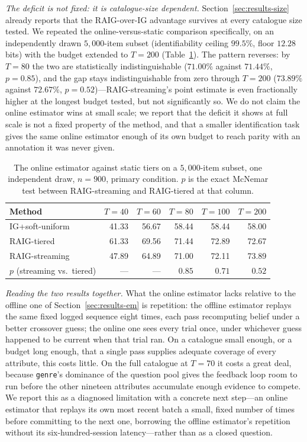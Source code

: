 \emph{The deficit is not fixed: it is catalogue-size dependent.}
Section~\ref{sec:results-size} already reports that the RAIG-over-IG
advantage survives at every catalogue size tested. We repeated the
online-versus-static comparison specifically, on an independently drawn
$5{,}000$-item subset (identifiability ceiling $99.5\%$, floor $12.28$ bits)
with the budget extended to $T=200$ (Table~\ref{tab:streamsize}). The pattern
reverses: by $T=80$ the two are statistically indistinguishable ($71.00\%$
against $71.44\%$, $p = 0.85$), and the gap stays indistinguishable from zero
through $T=200$ ($73.89\%$ against $72.67\%$, $p = 0.52$)---RAIG-streaming's
point estimate is even fractionally higher at the longest budget tested, but
not significantly so. We do not claim the online estimator wins at small
scale; we report that the deficit it shows at full scale is not a fixed
property of the method, and that a smaller identification task gives the
same online estimator enough of its own budget to reach parity with an
annotation it was never given.

\begin{table}[t]
\caption{The online estimator against static tiers on a $5{,}000$-item
subset, one independent draw, $n=900$, primary condition. $p$ is the exact
McNemar test between RAIG-streaming and RAIG-tiered at that column.}
\label{tab:streamsize}
\centering
\footnotesize
\begin{tabular}{@{}lrrrrr@{}}
\toprule
\textbf{Method} & \textbf{$T{=}40$} & \textbf{$T{=}60$} & \textbf{$T{=}80$} &
\textbf{$T{=}100$} & \textbf{$T{=}200$} \\
\midrule
IG+soft-uniform  & 41.33 & 56.67 & 58.44 & 58.44 & 58.00 \\
RAIG-tiered      & 61.33 & 69.56 & 71.44 & 72.89 & 72.67 \\
RAIG-streaming   & 47.89 & 64.89 & 71.00 & 72.11 & 73.89 \\
\midrule
$p$ (streaming vs.\ tiered) & --- & --- & $0.85$ & $0.71$ & $0.52$ \\
\bottomrule
\end{tabular}
\end{table}

\emph{Reading the two results together.} What the online estimator lacks
relative to the offline one of Section~\ref{sec:results-em} is repetition:
the offline estimator replays the same fixed logged sequence eight times,
each pass recomputing belief under a better crossover guess; the online one
sees every trial once, under whichever guess happened to be current when
that trial ran. On a catalogue small enough, or a budget long enough, that a
single pass supplies adequate coverage of every attribute, this costs little.
On the full catalogue at $T=70$ it costs a great deal, because
\texttt{genre}'s dominance of the question pool gives the feedback loop room
to run before the other nineteen attributes accumulate enough evidence to
compete. We report this as a diagnosed limitation with a concrete next
step---an online estimator that replays its own most recent batch a small,
fixed number of times before committing to the next one, borrowing the
offline estimator's repetition without its six-hundred-session
latency---rather than as a closed question.
